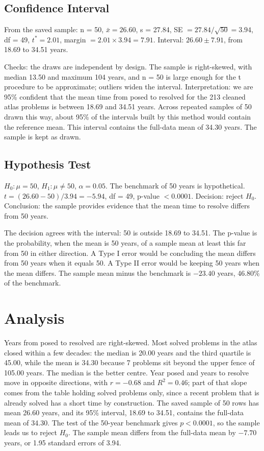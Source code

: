 \documentclass[11pt]{article}
\begin{document}
\subsection{Confidence Interval}

From the saved sample: n = 50, $\bar x = 26.60$, s = 27.84, SE $= 27.84/\sqrt{50} = 3.94$, df = 49, $t^* = 2.01$, margin $= 2.01 \times 3.94 = 7.91$. Interval: $26.60 \pm 7.91$, from 18.69 to 34.51 years.

Checks: the draws are independent by design. The sample is right-skewed, with median 13.50 and maximum 104 years, and n = 50 is large enough for the t procedure to be approximate; outliers widen the interval. Interpretation: we are 95\% confident that the mean time from posed to resolved for the 213 cleaned atlas problems is between 18.69 and 34.51 years. Across repeated samples of 50 drawn this way, about 95\% of the intervals built by this method would contain the reference mean. This interval contains the full-data mean of 34.30 years. The sample is kept as drawn.

\subsection{Hypothesis Test}

$H_0: \mu = 50$, $H_1: \mu \ne 50$, $\alpha = 0.05$. The benchmark of 50 years is hypothetical. $t = (26.60 - 50)/3.94 = -5.94$, df = 49, p-value $< 0.0001$. Decision: reject $H_0$. Conclusion: the sample provides evidence that the mean time to resolve differs from 50 years.

The decision agrees with the interval: 50 is outside 18.69 to 34.51. The p-value is the probability, when the mean is 50 years, of a sample mean at least this far from 50 in either direction. A Type I error would be concluding the mean differs from 50 years when it equals 50. A Type II error would be keeping 50 years when the mean differs. The sample mean minus the benchmark is $-23.40$ years, 46.80\% of the benchmark.

\section*{Analysis}
\noindent{}

\medskip
Years from posed to resolved are right-skewed. Most solved problems in the atlas closed within a few decades: the median is 20.00 years and the third quartile is 45.00, while the mean is 34.30 because 7 problems sit beyond the upper fence of 105.00 years. The median is the better centre. Year posed and years to resolve move in opposite directions, with $r = -0.68$ and $R^2 = 0.46$; part of that slope comes from the table holding solved problems only, since a recent problem that is already solved has a short time by construction. The saved sample of 50 rows has mean 26.60 years, and its 95\% interval, 18.69 to 34.51, contains the full-data mean of 34.30. The test of the 50-year benchmark gives $p < 0.0001$, so the sample leads us to reject $H_0$. The sample mean differs from the full-data mean by $-7.70$ years, or 1.95 standard errors of 3.94.
\end{document}
